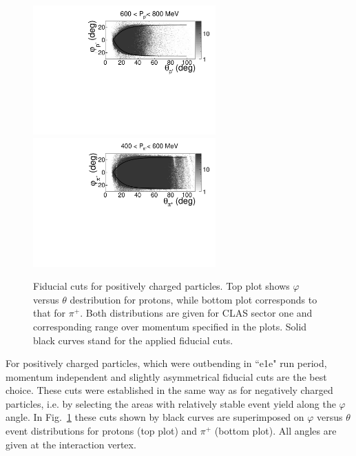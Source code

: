 \documentclass[prc,twocolumn,superscriptaddress,showpacs,amssymb,amsmath,amsfonts,linenumbers,aps]{revtex4-1}
\begin{document}
\begin{figure}[htp]
\begin{center}
 \includegraphics[width=7cm,keepaspectratio]{pictures/fiducial_cuts/protons.pdf}
\includegraphics[width=7cm,keepaspectratio]{pictures/fiducial_cuts/pip.pdf} 
\vspace{-0.1cm}
\caption{Fiducial cuts for positively charged particles. Top plot shows $\varphi$ versus $\theta$ destribution for protons, while bottom plot corresponds to that for $\pi^{+}$. Both distributions are given for CLAS sector one and corresponding range over momentum specified in the plots.  Solid black curves stand for the applied fiducial cuts. }
\label{fig:fid_cuts_pos}
\end{center}
\end{figure} 



For positively charged particles, which were outbending in ``e1e" run period, momentum independent and slightly asymmetrical fiducial cuts are the best choice. These cuts were established in the same way as for negatively charged particles, i.e.
by selecting the areas with relatively stable event yield along the $\varphi$ angle. In Fig.~\ref{fig:fid_cuts_pos} these cuts shown by black curves are superimposed on $\varphi$ versus $\theta$ event distributions for protons (top plot) and $\pi^{+}$ (bottom plot). All angles are given at the interaction vertex.  
\end{document}

